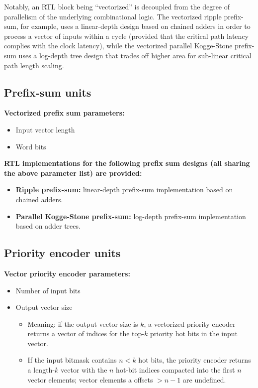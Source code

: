 Notably, an RTL block being ``vectorized'' is decoupled from the degree of parallelism of the underlying combinational logic. The vectorized ripple prefix-sum, for example, uses a linear-depth design based on chained adders in order to process a vector of inputs within a cycle (provided that the critical path latency complies with the clock latency), while the vectorized parallel Kogge-Stone\cite{koggestone} prefix-sum uses a log-depth tree design that trades off higher area for sub-linear critical path length scaling.

\subsection{Prefix-sum units}

\textbf{Vectorized prefix sum parameters:}

\begin{itemize}
    \item Input vector length
    \item Word bits
\end{itemize}

\textbf{RTL implementations for the following prefix sum designs (all sharing the above parameter list) are provided:}

\begin{itemize}
    \item \textbf{Ripple prefix-sum:} linear-depth prefix-sum implementation based on chained adders.
    \item \textbf{Parallel Kogge-Stone\cite{koggestone} prefix-sum:} log-depth prefix-sum implementation based on adder trees.
\end{itemize}

\subsection{Priority encoder units}

\textbf{Vector priority encoder parameters:}

\begin{itemize}
    \item Number of input bits
    \item Output vector size
    
    \begin{itemize}
        \item Meaning: if the output vector size is $k$, a vectorized priority encoder returns a vector of indices for the top-$k$ priority hot bits in the input vector. 
        \item If the input bitmask contains $n < k$ hot bits, the priority encoder returns a length-$k$ vector with the $n$ hot-bit indices compacted into the first $n$ vector elements; vector elements a offsets $>n-1$ are undefined.
    \end{itemize}

\end{itemize}

